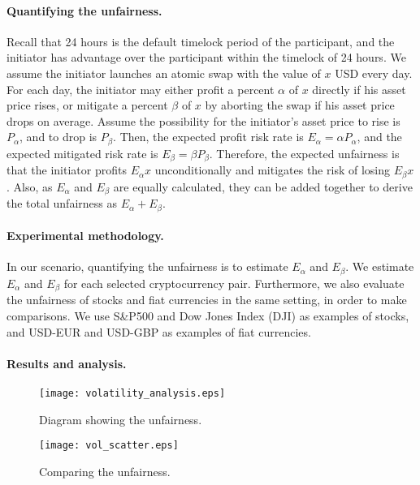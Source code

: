 \paragraph{Quantifying the unfairness.}
Recall that 24 hours is the default timelock period of the participant,
and the initiator has advantage over the participant within the timelock of 24 hours.
We assume the initiator launches an atomic swap with the value of $x$ USD every day.
For each day, the initiator may either profit a percent $\alpha$ of $x$ directly if his asset price rises,
or mitigate a percent $\beta$ of $x$ by aborting the swap if his asset price drops on average.
Assume the possibility for the initiator's asset price to rise is $P_{\alpha}$, and to drop is $P_{\beta}$.
Then, the expected profit risk rate is $E_{\alpha} = \alpha P_{\alpha}$,
and the expected mitigated risk rate is $E_{\beta} = \beta P_{\beta}$.
Therefore, the expected unfairness is that the initiator profits $E_{\alpha} x$ unconditionally and mitigates the risk of losing $E_{\beta} x$.
Also, as $E_\alpha$ and $E_\beta$ are equally calculated, they can be added together to derive the total unfairness as $E_\alpha + E_\beta$.

\paragraph{Experimental methodology.}
In our scenario, quantifying the unfairness is to estimate $E_{\alpha}$ and $E_{\beta}$.
We estimate $E_{\alpha}$ and $E_{\beta}$ for each selected cryptocurrency pair.
Furthermore,  we also evaluate the unfairness of stocks and fiat currencies in the same setting, in order to make comparisons.
We use S\&P500 and Dow Jones Index (DJI) as examples of stocks, and USD-EUR and USD-GBP as examples of fiat currencies.

\paragraph{Results and analysis.}

\begin{figure*}
    \texttt{[image: volatility\_analysis.eps]}
    \caption{Diagram showing the unfairness. }
    \label{fig:volatility_analysis}
\end{figure*}

\begin{figure}
    \texttt{[image: vol\_scatter.eps]}
    \caption{Comparing the unfairness. }
    \label{fig:vol_scatter}
\end{figure}

